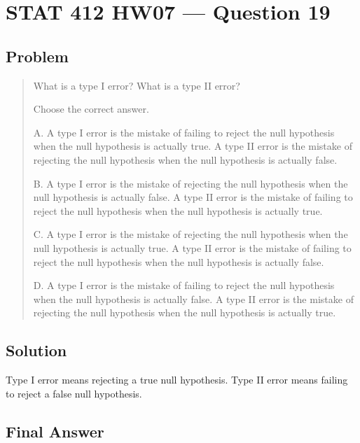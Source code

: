 \documentclass[11pt]{article}
\begin{document}
\section*{STAT 412 HW07 --- Question 19}

\subsection*{Problem}

\begin{quote}
What is a type I error? What is a type II error?

Choose the correct answer.

A. A type I error is the mistake of failing to reject the null hypothesis when the null hypothesis is actually true. A type II error is the mistake of rejecting the null hypothesis when the null hypothesis is actually false.

B. A type I error is the mistake of rejecting the null hypothesis when the null hypothesis is actually false. A type II error is the mistake of failing to reject the null hypothesis when the null hypothesis is actually true.

C. A type I error is the mistake of rejecting the null hypothesis when the null hypothesis is actually true. A type II error is the mistake of failing to reject the null hypothesis when the null hypothesis is actually false.

D. A type I error is the mistake of failing to reject the null hypothesis when the null hypothesis is actually false. A type II error is the mistake of rejecting the null hypothesis when the null hypothesis is actually true.
\end{quote}

\subsection*{Solution}

Type I error means rejecting a true null hypothesis. Type II error means failing to reject a false null hypothesis.

\subsection*{Final Answer}

\end{document}
